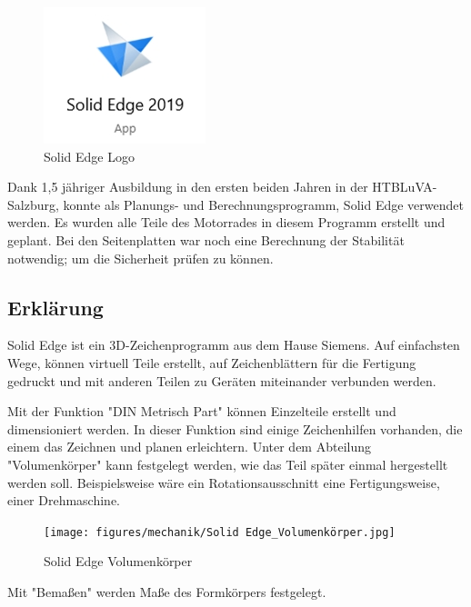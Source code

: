 \begin{figure} [H]
	\begin{center}
		\includegraphics[scale=0.5]{figures/mechanik/Untitled.jpg}
			\caption{Solid Edge Logo}
			\label{fig:Solid Edge Logo}
	\end{center}
\end{figure}


Dank 1,5 jähriger Ausbildung in den ersten beiden Jahren in der HTBLuVA-Salzburg, konnte als Planungs- und Berechnungsprogramm, Solid Edge verwendet werden. 
Es wurden alle Teile des Motorrades in diesem Programm erstellt und geplant. Bei den Seitenplatten war noch eine Berechnung der Stabilität notwendig; um die Sicherheit prüfen zu können. 

\subsection{Erklärung}

Solid Edge ist ein 3D-Zeichenprogramm aus dem Hause Siemens. Auf einfachsten Wege, können virtuell Teile erstellt, auf Zeichenblättern für die Fertigung gedruckt und mit anderen Teilen zu Geräten miteinander verbunden werden. 

Mit der Funktion "DIN Metrisch Part" können Einzelteile erstellt und dimensioniert werden. In dieser Funktion sind einige Zeichenhilfen vorhanden, die einem das Zeichnen und planen erleichtern. Unter dem Abteilung "Volumenkörper" kann festgelegt werden, wie das Teil später einmal hergestellt werden soll. Beispielsweise wäre ein Rotationsausschnitt eine Fertigungsweise, einer Drehmaschine.


\begin{figure} [H]
	\begin{center}
		\texttt{[image: figures/mechanik/Solid Edge\_Volumenkörper.jpg]}
			\caption{Solid Edge Volumenkörper}
			\label{fig:Solid Edge Volumenkörper}
	\end{center}
\end{figure}


Mit "Bemaßen" werden Maße des Formkörpers festgelegt.


